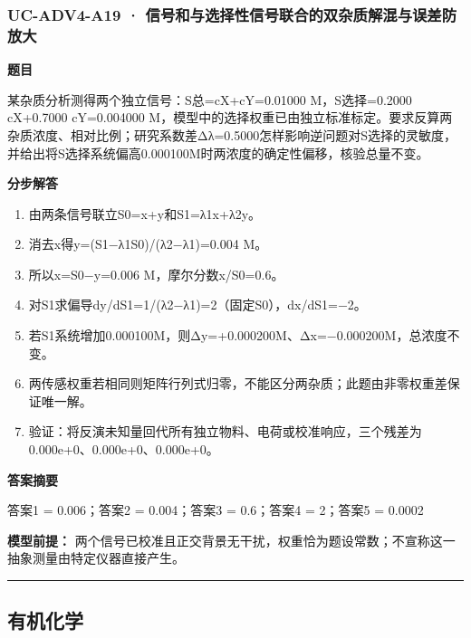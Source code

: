 \documentclass[UTF8,11pt,a4paper]{ctexart}
\begin{document}
\subsubsection*{UC-ADV4-A19 · 信号和与选择性信号联合的双杂质解混与误差防放大}
\noindent\textbf{题目}\par
某杂质分析测得两个独立信号：S总=cX+cY=0.01000 M，S选择=0.2000 cX+0.7000 cY=0.004000 M，模型中的选择权重已由独立标准标定。要求反算两杂质浓度、相对比例；研究系数差Δλ=0.5000怎样影响逆问题对S选择的灵敏度，并给出将S选择系统偏高0.000100M时两浓度的确定性偏移，核验总量不变。\par
\medskip\noindent\textbf{分步解答}
\begin{enumerate}
\item 由两条信号联立S0=x+y和S1=λ1x+λ2y。
\item 消去x得y=(S1−λ1S0)/(λ2−λ1)=0.004 M。
\item 所以x=S0−y=0.006 M，摩尔分数x/S0=0.6。
\item 对S1求偏导dy/dS1=1/(λ2−λ1)=2（固定S0），dx/dS1=−2。
\item 若S1系统增加0.000100M，则Δy=+0.000200M、Δx=−0.000200M，总浓度不变。
\item 两传感权重若相同则矩阵行列式归零，不能区分两杂质；此题由非零权重差保证唯一解。
\item 验证：将反演未知量回代所有独立物料、电荷或校准响应，三个残差为0.000e+0、0.000e+0、0.000e+0。
\end{enumerate}
\noindent\textbf{答案摘要}\par
答案1 = 0.006；答案2 = 0.004；答案3 = 0.6；答案4 = 2；答案5 = 0.0002\par
\noindent\textbf{模型前提：}
两个信号已校准且正交背景无干扰，权重恰为题设常数；不宣称这一抽象测量由特定仪器直接产生。\par
\medskip\hrule\medskip
\subsection*{有机化学}
\end{document}

